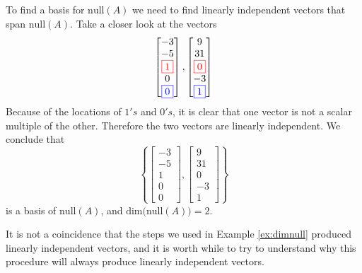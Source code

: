 \documentclass{ximera}
\begin{document}
\begin{example}
\begin{explanation}
To find a basis for $\mbox{null}(A)$ we need to find linearly independent vectors that span $\mbox{null}(A)$.  Take a closer look at the vectors
$$\begin{bmatrix}-3\\-5\\{\color{red}\fbox{$1$}}\\0\\{\color{blue}\fbox{$0$}}\end{bmatrix}, \begin{bmatrix}9\\31\\{\color{red}\fbox{$0$}}\\-3\\{\color{blue}\fbox{$1$}}\end{bmatrix}$$
Because of the locations of $1's$ and $0's$, it is clear that one vector is not a scalar multiple of the other.  Therefore the two vectors are linearly independent.  We conclude that 
$$\left\{\begin{bmatrix}-3\\-5\\1\\0\\0\end{bmatrix}, \begin{bmatrix}9\\31\\0\\-3\\1\end{bmatrix}\right\}$$
is a basis of $\mbox{null}(A)$, and $\mbox{dim}\Big(\mbox{null}(A)\Big)=2$.
\end{explanation}
\end{example}
It is not a coincidence that the steps we used in Example \ref{ex:dimnull} produced linearly independent vectors, and it is worth while to try to understand why this procedure will always produce linearly independent vectors.
\end{document}
